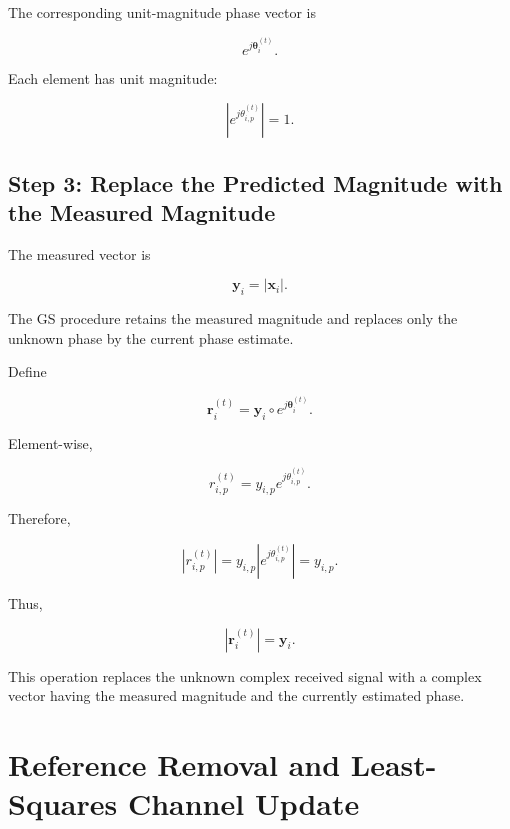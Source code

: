\documentclass[12pt,a4paper]{article}
\begin{document}
The corresponding unit-magnitude phase vector is

\begin{equation}
e^{j\boldsymbol{\theta}_i^{(t)}}.
\tag{302}
\end{equation}

Each element has unit magnitude:

\begin{equation}
\left|
e^{j\theta_{i,p}^{(t)}}
\right|
=
1.
\tag{303}
\end{equation}

\subsection{Step 3: Replace the Predicted Magnitude with the Measured Magnitude}

The measured vector is

\begin{equation}
\mathbf y_i
=
|\mathbf x_i|.
\tag{304}
\end{equation}

The GS procedure retains the measured magnitude and replaces only the unknown phase by the current phase estimate.

Define

\begin{equation}
\boxed{
\mathbf r_i^{(t)}
=
\mathbf y_i
\circ
e^{j\boldsymbol{\theta}_i^{(t)}}
}.
\tag{305}
\end{equation}

Element-wise,

\begin{equation}
\boxed{
r_{i,p}^{(t)}
=
y_{i,p}
e^{j\theta_{i,p}^{(t)}}
}.
\tag{306}
\end{equation}

Therefore,

\begin{equation}
\left|
r_{i,p}^{(t)}
\right|
=
y_{i,p}
\left|
e^{j\theta_{i,p}^{(t)}}
\right|
=
y_{i,p}.
\tag{307}
\end{equation}

Thus,

\begin{equation}
\boxed{
|\mathbf r_i^{(t)}|
=
\mathbf y_i
}.
\tag{308}
\end{equation}

This operation replaces the unknown complex received signal with a complex vector having the measured magnitude and the currently estimated phase.

\section{Reference Removal and Least-Squares Channel Update}
\end{document}
